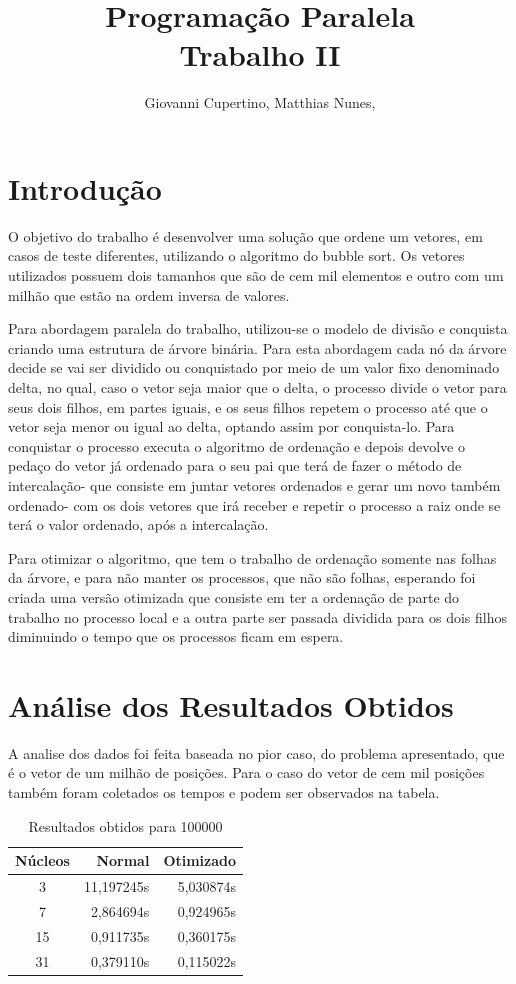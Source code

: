 \documentclass[9pt]{IEEEtran}
\title{Programação Paralela\\ Trabalho II}
\author{Giovanni Cupertino, Matthias Nunes, \IEEEmembership{Usuário pp12820}}
\begin{document}
\maketitle

\section{Introdução}

	O objetivo do trabalho é desenvolver uma solução que ordene um vetores, em
	casos de teste diferentes, utilizando o algoritmo do bubble sort. Os vetores
	utilizados possuem dois tamanhos que são de cem mil elementos e outro com um
	milhão que estão na ordem inversa de valores.

	Para abordagem paralela do trabalho, utilizou-se o modelo de divisão e
	conquista criando uma estrutura de árvore binária. Para esta abordagem cada
	nó da árvore decide se vai ser dividido ou conquistado por meio de um valor
	fixo denominado delta, no qual, caso o vetor seja maior que o delta, o
	processo divide o vetor para seus dois filhos, em partes iguais, e os seus
	filhos repetem o processo até que o vetor seja menor ou igual ao delta,
	optando assim por conquista-lo. Para conquistar o processo executa o
	algoritmo de ordenação e depois devolve o pedaço do vetor já ordenado para o
	seu pai que terá de fazer o método de intercalação- que consiste em juntar
	vetores ordenados e gerar um novo também ordenado- com os dois vetores que
	irá receber e repetir o processo a raiz onde se terá o valor ordenado, após
	a intercalação.

	Para otimizar o algoritmo, que tem o trabalho de ordenação somente nas
	folhas da árvore, e para não manter os processos, que não são folhas,
	esperando foi criada uma versão otimizada que consiste em ter a ordenação de
	parte do trabalho no processo local e a outra parte ser passada dividida
	para os dois filhos diminuindo o tempo que os processos ficam em espera.

\section{Análise dos Resultados Obtidos}

	A analise dos dados foi feita baseada no pior caso, do problema apresentado,
	que é o vetor de um milhão de posições. Para o caso do vetor de cem mil
	posições também foram coletados os tempos e podem ser observados na tabela.

	\begin{table}[H]
		\centering
			\begin{tabular}{c|r|r}
				Núcleos & Normal & Otimizado \\
				\hline
				3  & 11,197245s & 5,030874s \\
				\hline
				7  &  2,864694s & 0,924965s \\
				\hline
				15 &  0,911735s & 0,360175s \\
				\hline
				31 &  0,379110s & 0,115022s \\
			\end{tabular}
		\caption{Resultados obtidos para 100000}
		\label{result_table}
	\end{table}
\end{document}

